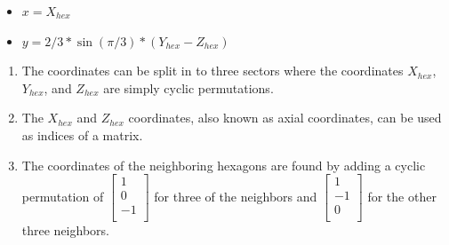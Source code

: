 \documentclass{beamer}
\begin{document}
\begin{frame}{}
    \begin{center}
         \begin{itemize}
            \item $x = X_{hex}$
            \item $y = 2/3*\sin(\pi/3)*\left ( Y_{hex}-Z_{hex} \right )$
        \end{itemize}
\begin{enumerate} 
    \item The coordinates can be split in to three sectors where the coordinates $X_{hex}$, $Y_{hex}$, and $Z_{hex}$ are simply cyclic permutations.
    \item The $X_{hex}$ and $Z_{hex}$ coordinates, also known as axial coordinates, can be used as indices of a matrix.
    \item  The coordinates of the neighboring hexagons are found by adding a cyclic permutation of 
        $\left [
            \begin{array}{c}
                1 \\
                0 \\
                -1\\
            \end{array}
        \right ]$
        for three of the neighbors and
        $\left [ 
            \begin{array}{c}
                1 \\
                -1 \\
                0\\
            \end{array}
        \right ]$
        for the other three neighbors.
\end{enumerate}
        
    \end{center}
\end{frame}
\end{document}
